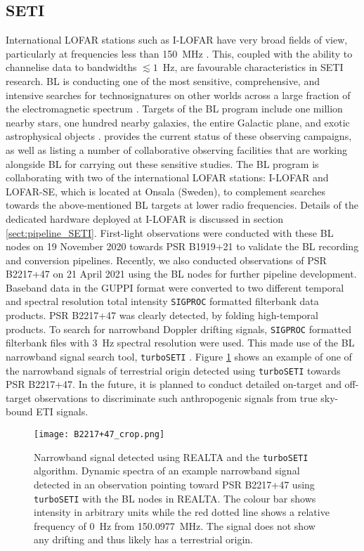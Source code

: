 \subsection{SETI}
International LOFAR stations such as I-LOFAR have very broad fields of view, particularly at frequencies less than 150~MHz \citep{VanHaarlem2013}. This, coupled with the ability to channelise data to bandwidths $\lesssim 1$~Hz, are favourable characteristics in SETI research.
BL is conducting one of the most sensitive, comprehensive, and intensive searches for technosignatures on other worlds across a large fraction of the electromagnetic spectrum \citep{Worden2017}. Targets of the BL program include one million nearby stars, one hundred nearby galaxies, the entire Galactic plane, and exotic astrophysical objects \citep[see][for detail]{Isaacson2017}. \cite{Gajjar2019} provides the current status of these observing campaigns, as well as listing a number of collaborative observing facilities that are working alongside BL for carrying out these sensitive studies. The BL program is collaborating with two of the international LOFAR stations: I-LOFAR and LOFAR-SE, which is located at Onsala (Sweden), to complement searches towards the above-mentioned BL targets at lower radio frequencies. Details of the dedicated hardware deployed at I-LOFAR is discussed in section \ref{sect:pipeline_SETI}. First-light observations were conducted with these BL nodes on 19 November 2020 towards PSR B1919+21 to validate the BL recording and conversion pipelines.
Recently, we also conducted observations of PSR B2217+47 on 21 April 2021 using the BL nodes for further pipeline development. Baseband data in the GUPPI format were converted to two different temporal and spectral resolution total intensity \texttt{SIGPROC} formatted filterbank data products. PSR B2217+47 was clearly detected, by folding high-temporal products. To search for narrowband Doppler drifting signals, \texttt{SIGPROC} formatted filterbank files with 3~Hz spectral resolution were used. This made use of the BL narrowband signal search tool, \texttt{turboSETI} \citep{Enriquez2017}. Figure \ref{fig:BL_fig} shows an example of one of the narrowband signals of terrestrial origin detected using \texttt{turboSETI} towards PSR B2217+47. In the future, it is planned to conduct detailed on-target and off-target observations to discriminate such anthropogenic signals from true sky-bound ETI signals. 


\begin{figure}
    \centering
    \texttt{[image: B2217+47\_crop.png]}
    \caption[Narrowband signal detected using REALTA and the \texttt{turboSETI} algorithm.]{Narrowband signal detected using REALTA and the \texttt{turboSETI} algorithm. Dynamic spectra of an example narrowband signal detected in an observation pointing toward PSR B2217+47 using \texttt{turboSETI} with the BL nodes in REALTA. The colour bar shows intensity in arbitrary units while the red dotted line shows a relative frequency of 0~Hz from 150.0977~MHz. The signal does not show any drifting and thus likely has a terrestrial origin.}
    \label{fig:BL_fig}
\end{figure}


